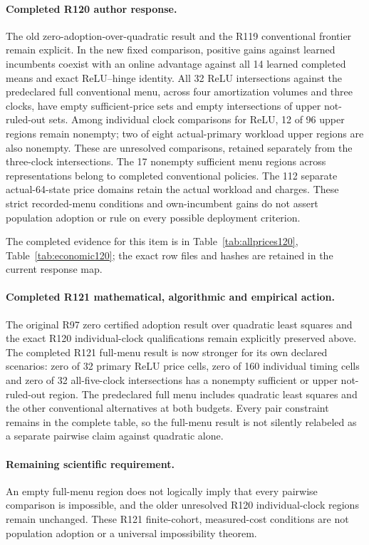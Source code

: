 \paragraph{Completed R120 author response.}
The old zero-adoption-over-quadratic result and the R119 conventional frontier remain explicit. In the new fixed comparison, positive gains against learned incumbents coexist with an online advantage against all 14 learned completed means and exact ReLU--hinge identity. All 32 ReLU intersections against the predeclared full conventional menu, across four amortization volumes and three clocks, have empty sufficient-price sets and empty intersections of upper not-ruled-out sets. Among individual clock comparisons for ReLU, 12 of 96 upper regions remain nonempty; two of eight actual-primary workload upper regions are also nonempty. These are unresolved comparisons, retained separately from the three-clock intersections. The 17 nonempty sufficient menu regions across representations belong to completed conventional policies. The 112 separate actual-64-state price domains retain the actual workload and charges. These strict recorded-menu conditions and own-incumbent gains do not assert population adoption or rule on every possible deployment criterion.

The completed evidence for this item is in Table~\ref{tab:allprices120}, Table~\ref{tab:economic120}; the exact row files and hashes are retained in the current response map.

\paragraph{Completed R121 mathematical, algorithmic and empirical action.}
The original R97 zero certified adoption result over quadratic least squares and the exact R120 individual-clock qualifications remain explicitly preserved above. The completed R121 full-menu result is now stronger for its own declared scenarios: zero of 32 primary ReLU price cells, zero of 160 individual timing cells and zero of 32 all-five-clock intersections has a nonempty sufficient or upper not-ruled-out region. The predeclared full menu includes quadratic least squares and the other conventional alternatives at both budgets. Every pair constraint remains in the complete table, so the full-menu result is not silently relabeled as a separate pairwise claim against quadratic alone.

\paragraph{Remaining scientific requirement.}
An empty full-menu region does not logically imply that every pairwise comparison is impossible, and the older unresolved R120 individual-clock regions remain unchanged. These R121 finite-cohort, measured-cost conditions are not population adoption or a universal impossibility theorem.

